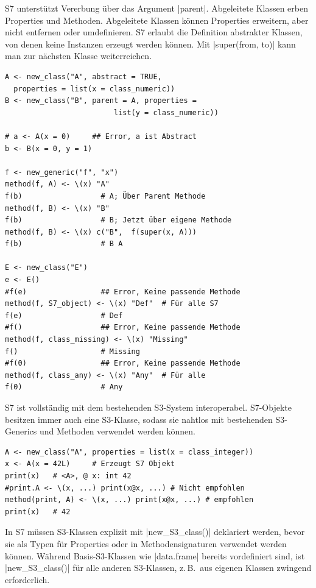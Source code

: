 \documentclass[10pt,twocolumn]{scrartcl}
\renewcommand{\lstinline}{\mycoloredinline}
\begin{document}
S7 unterstützt Vererbung über das Argument \lstinline|parent|. Abgeleitete Klassen erben Properties und Methoden. Abgeleitete Klassen können Properties erweitern, aber nicht entfernen oder umdefinieren. S7 erlaubt die Definition abstrakter Klassen, von denen keine Instanzen erzeugt werden können. Mit \lstinline|super(from, to)| kann man zur nächsten Klasse weiterreichen.

\begin{lstlisting}
A <- new_class("A", abstract = TRUE,
  properties = list(x = class_numeric))
B <- new_class("B", parent = A, properties =
                         list(y = class_numeric))

# a <- A(x = 0)     ## Error, a ist Abstract
b <- B(x = 0, y = 1)

f <- new_generic("f", "x")
method(f, A) <- \(x) "A"
f(b)                  # A; Über Parent Methode
method(f, B) <- \(x) "B"
f(b)                  # B; Jetzt über eigene Methode
method(f, B) <- \(x) c("B",  f(super(x, A)))
f(b)                  # B A

E <- new_class("E")
e <- E()
#f(e)                 ## Error, Keine passende Methode
method(f, S7_object) <- \(x) "Def"  # Für alle S7
f(e)                  # Def
#f()                  ## Error, Keine passende Methode
method(f, class_missing) <- \(x) "Missing"
f()                   # Missing
#f(0)                 ## Error, Keine passende Methode
method(f, class_any) <- \(x) "Any"  # Für alle
f(0)                  # Any
\end{lstlisting}

S7 ist vollständig mit dem bestehenden S3-System interoperabel. S7-Objekte besitzen immer auch eine S3-Klasse, sodass sie nahtlos mit bestehenden S3-Generics und Methoden verwendet werden können.

\begin{lstlisting}
A <- new_class("A", properties = list(x = class_integer))
x <- A(x = 42L)     # Erzeugt S7 Objekt
print(x)   # <A>, @ x: int 42
#print.A <- \(x, ...) print(x@x, ...) # Nicht empfohlen
method(print, A) <- \(x, ...) print(x@x, ...) # empfohlen
print(x)   # 42
\end{lstlisting}

In S7 müssen S3-Klassen explizit mit \lstinline|new_S3_class()| deklariert werden, bevor sie als Typen für Properties oder in Methodensignaturen verwendet werden können. Während Basis-S3-Klassen wie \lstinline|data.frame| bereits vordefiniert sind, ist \lstinline|new_S3_class()| für alle anderen S3-Klassen, z.\,B.\ aus eigenen Klassen zwingend erforderlich.
\end{document}
